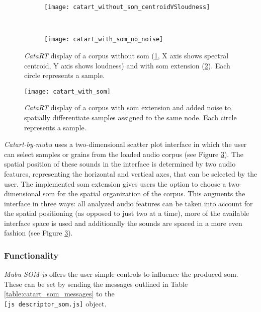 \begin{figure}[!htb]
  \centering
\begin{subfigure}{0.45\textwidth}
  \centering
  \texttt{[image: catart\_without\_som\_centroidVSloudness]}
  \caption{}
  \label{fig:catart_no_som}
\end{subfigure}
~
\begin{subfigure}{0.45\textwidth}
  \centering
  \texttt{[image: catart\_with\_som\_no\_noise]}
  \caption{}
  \label{fig:catart_with_som_no_noise}
\end{subfigure}
\caption[\textit{CataRT}: with and without \gls{som}]{\textit{CataRT} display of
a corpus without \gls{som} (\ref{fig:catart_no_som}, X axis shows spectral
centroid, Y axis shows loudness) and with \gls{som} extension
(\ref{fig:catart_with_som_no_noise}). Each circle represents a sample.}
\label{fig:catart_som_vs_no_som}
\end{figure}

\begin{figure}[!htb]
  \centering
  \texttt{[image: catart\_with\_som]}
  \caption[\textit{CataRT}: \gls{som} with added noise ]{\textit{CataRT}
  display of a corpus with \gls{som} extension and added noise to
  spatially differentiate samples assigned to the same node. Each circle
  represents a sample.}
  \label{fig:catart_with_som_noise}
\end{figure}


\textit{Catart-by-mubu} uses a
two-dimensional scatter plot interface in which the user can select samples or
grains from the loaded audio corpus (see Figure \ref{fig:catart_som_vs_no_som}).
The spatial position of these sounds in the interface is determined by two audio
features, representing the horizontal and vertical axes, that can be selected by
the user.
The implemented \gls{som} extension gives users the option to choose a
two-dimensional \gls{som} for the spatial organization of the corpus. This
augments the interface in three ways: all analyzed audio features can be
taken into account for the spatial positioning (as opposed to just two at a
time), more of the available interface space is used and additionally the sounds
are spaced in a more even fashion (see Figure \ref{fig:catart_som_vs_no_som}).

\subsubsection{Functionality}
\label{subsubec:mubu-som_functionality}
\textit{Mubu-SOM-js} offers the user simple controls to influence the produced
\gls{som}. These can be set by sending the messages outlined in Table
\ref{table:catart_som_messages} to the \\ \texttt{[js descriptor\_som.js]}
object.


